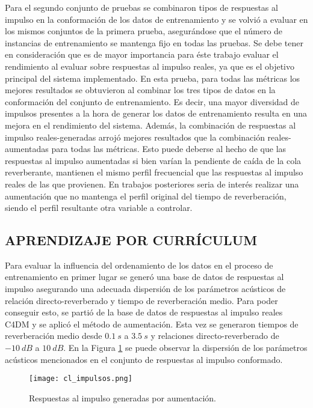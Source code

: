 Para el segundo conjunto de pruebas se combinaron tipos de respuestas al impulso en la conformación de los datos de entrenamiento y se volvió a evaluar en los mismos conjuntos de la primera prueba, asegurándose que el número de instancias de entrenamiento se mantenga fijo en todas las pruebas. Se debe tener en consideración que es de mayor importancia para éste trabajo evaluar el rendimiento al evaluar sobre respuestas al impulso reales, ya que es el objetivo principal del sistema implementado. En esta prueba, para todas las métricas los mejores resultados se obtuvieron al combinar los tres tipos de datos en la conformación del conjunto de entrenamiento. Es decir, una mayor diversidad de impulsos presentes a la hora de generar los datos de entrenamiento resulta en una mejora en el rendimiento del sistema. Además, la combinación de respuestas al impulso reales-generadas arrojó mejores resultados que la combinación reales-aumentadas para todas las métricas. Esto puede deberse al hecho de que las respuestas al impulso aumentadas si bien varían la pendiente de caída de la cola reverberante, mantienen el mismo perfil frecuencial que las respuestas al impulso reales de las que provienen. En trabajos posteriores seria de interés realizar una aumentación que no mantenga el perfil original del tiempo de reverberación, siendo el perfil resultante otra variable a controlar. 


\subsection[Aprendizaje por currículum]{APRENDIZAJE POR CURRÍCULUM}
Para evaluar la influencia del ordenamiento de los datos en el proceso de entrenamiento en primer lugar se generó una base de datos de respuestas al impulso asegurando una adecuada dispersión de los parámetros acústicos de relación directo-reverberado y tiempo de reverberación medio. Para poder conseguir esto, se partió de la base de datos de respuestas al impulso reales C4DM y se aplicó el método de aumentación. Esta vez se generaron tiempos de reverberación medio desde $0.1 \ s$ a $3.5 \ s$ y relaciones directo-reverberado de $-10 \ dB$ a $10 \ dB$. En la Figura \ref{fig:cl_impulsos} se puede observar la dispersión de los parámetros acústicos mencionados en el conjunto de respuestas al impulso conformado.

\begin{figure}[H]
	\centering{}
	\texttt{[image: cl\_impulsos.png]}
	\caption{Respuestas al impulso generadas por aumentación.}
	\label{fig:cl_impulsos}
\end{figure}

